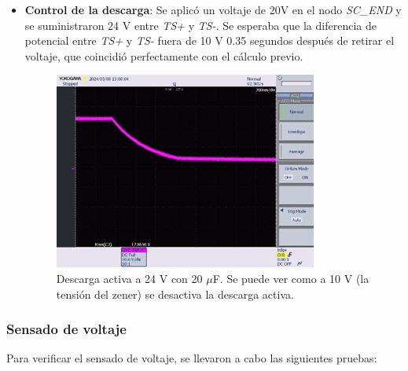 \begin{itemize}
	\item \textbf{Control de la descarga}: Se aplicó un voltaje de 20V en el nodo \textit{SC\_END} y se suministraron 24 V entre \textit{TS+} y \textit{TS-}. Se esperaba que la diferencia de potencial entre \textit{TS+} y \textit{TS-} fuera de 10 V 0.35 segundos después de retirar el voltaje, que coincidió perfectamente con el cálculo previo.
	\begin{figure}[H]
		\centering
		\includegraphics[width=0.7\linewidth]{fig/discharge2}
		\caption{Descarga activa a 24 V con 20 $\mu$F. Se puede ver como a 10 V (la tensión del zener) se desactiva la descarga activa.}
	\end{figure}
\end{itemize}
	
	
\subsubsection{Sensado de voltaje}

Para verificar el sensado de voltaje, se llevaron a cabo las siguientes pruebas:

